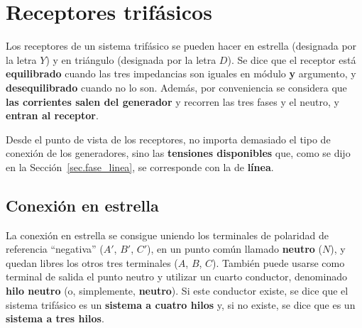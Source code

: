 	
	\section{Receptores trifásicos}\label{sec.conexiones}
	Los receptores de un sistema trifásico se pueden hacer en estrella (designada por la letra $Y$) y en triángulo (designada por la letra $D$). Se dice que el receptor está \textbf{equilibrado} cuando las tres impedancias son iguales en módulo \textbf{y} argumento, y \textbf{desequilibrado} cuando no lo son. Además, por conveniencia se considera que \textbf{las corrientes salen del generador} y recorren las tres fases y el neutro, y \textbf{entran al receptor}.
	
	\begin{remark}
	    Desde el punto de vista de los receptores, no importa demasiado el tipo de conexión de los generadores, sino las \textbf{tensiones disponibles} que, como se dijo en la Sección~\ref{sec.fase_linea}, se corresponde con la de \textbf{línea}.
	\end{remark}
	
	
	\subsection{Conexión en estrella}
	La conexión en estrella se consigue uniendo los terminales de polaridad de referencia ``negativa'' ($A'$, $B'$, $C'$), en un punto común llamado \textbf{neutro} ($N$), y quedan libres los otros tres terminales ($A$, $B$, $C$). También puede usarse como terminal de salida el punto neutro y utilizar un cuarto conductor, denominado \textbf{hilo neutro} (o, simplemente, \textbf{neutro}). Si este conductor existe, se dice que el sistema trifásico es un \textbf{sistema a cuatro hilos} y, si no existe, se dice que es un \textbf{sistema a tres hilos}. 
	
